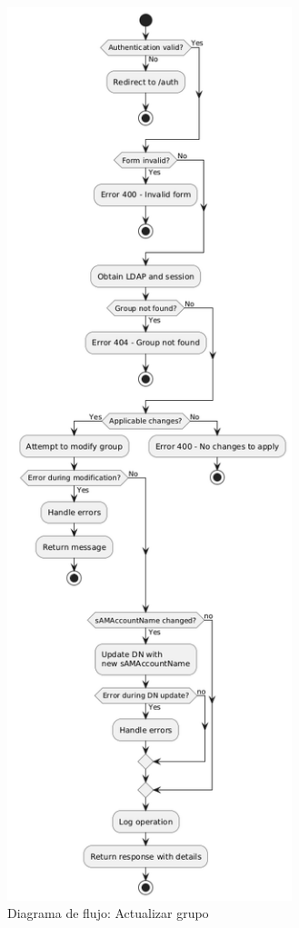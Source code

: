 \begin{figure}[H]
    \centering
    \includegraphics[height=26cm]{images/puml/flow-diagram-update group/flow-diagram update group.png}
    \caption{Diagrama de flujo: Actualizar grupo}
    \label{fig:flow-diagram-update-group}
\end{figure}
\restoregeometry